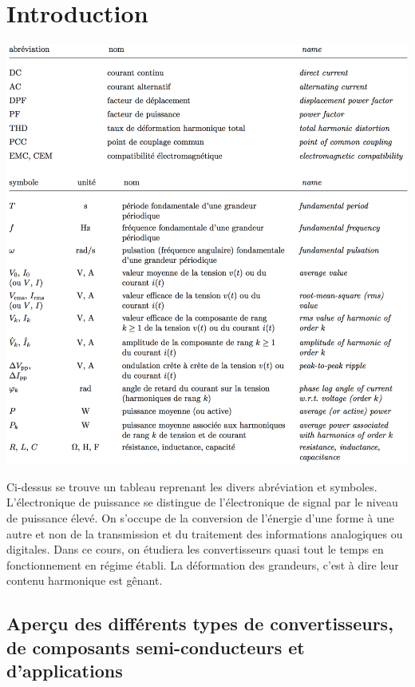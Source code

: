
\chapter{Introduction}
	
	\begin{center}
		\includegraphics[scale=0.65]{ch1/1}
		\label{table:1.1}
	\end{center}
	
	Ci-dessus se trouve un tableau reprenant les divers abréviation et symboles. 	L'électronique de puissance se distingue de l'électronique de signal par le niveau de puissance élevé. On s'occupe de la conversion de l'énergie d'une forme à une autre et non de la transmission et du traitement des informations analogiques ou digitales. Dans ce cours, on étudiera les convertisseurs quasi tout le temps en fonctionnement en régime établi. La déformation des grandeurs, c'est à dire leur contenu harmonique est gênant. 
	
\section{Aperçu des différents types de convertisseurs, de composants semi-conducteurs et d'applications}

